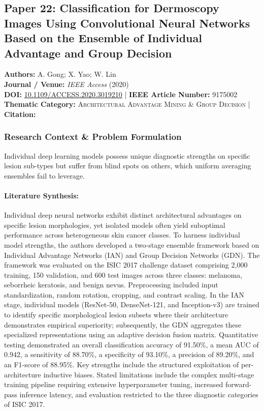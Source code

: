\subsection{Paper 22: Classification for Dermoscopy Images Using Convolutional Neural Networks Based on the Ensemble of Individual Advantage and Group Decision}
\label{sec:paper_22}

\begin{tcolorbox}[colback=gray!5!white,colframe=gray!75!black,title=\textbf{Metadata \& Citation Summary}]
\textbf{Authors:} A. Gong; X. Yao; W. Lin \\
\textbf{Journal / Venue:} \textit{IEEE Access} (2020) \\
\textbf{DOI:} \href{https://doi.org/10.1109/ACCESS.2020.3019210}{10.1109/ACCESS.2020.3019210} \quad | \quad \textbf{IEEE Article Number:} 9175002 \\
\textbf{Thematic Category:} \textsc{Architectural Advantage Mining \& Group Decision} \quad | \quad \textbf{Citation:} \cite{9175002}
\end{tcolorbox}

\subsubsection*{Research Context \& Problem Formulation}
Individual deep learning models possess unique diagnostic strengths on specific lesion sub-types but suffer from blind spots on others, which uniform averaging ensembles fail to leverage.

\paragraph{Literature Synthesis:} Individual deep neural networks exhibit distinct architectural advantages on specific lesion morphologies, yet isolated models often yield suboptimal performance across heterogeneous skin cancer classes. To harness individual model strengths, the authors developed a two-stage ensemble framework based on Individual Advantage Networks (IAN) and Group Decision Networks (GDN). The framework was evaluated on the ISIC 2017 challenge dataset comprising 2,000 training, 150 validation, and 600 test images across three classes: melanoma, seborrheic keratosis, and benign nevus. Preprocessing included input standardization, random rotation, cropping, and contrast scaling. In the IAN stage, individual models (ResNet-50, DenseNet-121, and Inception-v3) are trained to identify specific morphological lesion subsets where their architecture demonstrates empirical superiority; subsequently, the GDN aggregates these specialized representations using an adaptive decision fusion matrix. Quantitative testing demonstrated an overall classification accuracy of 91.50\%, a mean AUC of 0.942, a sensitivity of 88.70\%, a specificity of 93.10\%, a precision of 89.20\%, and an F1-score of 88.95\%. Key strengths include the structured exploitation of per-architecture inductive biases. Stated limitations include the complex multi-stage training pipeline requiring extensive hyperparameter tuning, increased forward-pass inference latency, and evaluation restricted to the three diagnostic categories of ISIC 2017.

